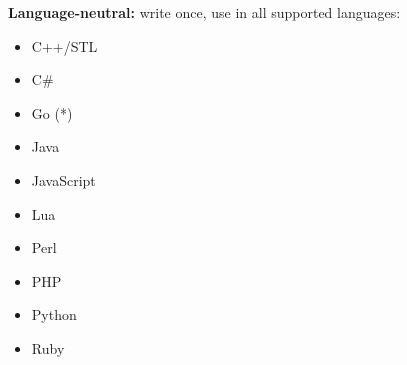 \documentclass[a0paper,portrait]{baposter}
\begin{document}
\begin{poster}
{\begin{multicols}{2}
    \begin{minipage}{0.40\textwidth}
      \begin{flushleft}
        \textbf{Language-neutral:} write once, use in all supported languages:	
				
				\begin{multicols}{2}
				  \begin{minipage}{0.5\textwidth}
						\begin{itemize}
							\item C++/STL
							\item C\#
							\item Go (*)
							\item Java
							\item JavaScript
						\end{itemize}
				  \end{minipage}
					
				  \begin{minipage}{0.5\textwidth}
						\begin{itemize}
							\item Lua
							\item Perl
							\item PHP
							\item Python
							\item Ruby
						\end{itemize}
				  \end{minipage}
        \end{multicols}
      \end{flushleft}      
    \end{minipage}
  \end{multicols}
\vspace{0.1cm}
}



\end{poster}
\end{document}
